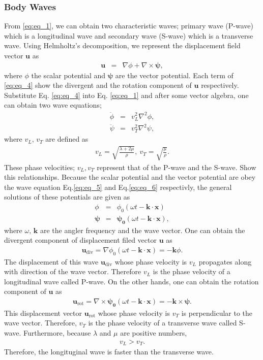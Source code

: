 \subsubsection{Body Waves}
From \ref{eq:eq_1}, we can obtain two characteristic waves; primary wave (P-wave) which is a longitudinal wave and secondary wave (S-wave) which is a transverse wave. Using Helmholtz's decomposition, we represent the displacement field vector $\bm{u}$ as
\begin{eqnarray} 
  \bm{u} &=& \nabla\phi + \nabla\times\bm{\psi}, \label{eq:eq_4}
\end{eqnarray}
where $\phi$ the scalar potential and $\bm{\psi}$ are the vector potential. Each term of \ref{eq:eq_4} show the divergent and the rotation component of $\bm{u}$ respectively. Substitute Eq. \ref{eq:eq_4} into Eq. \ref{eq:eq_1} and after some vector algebra, one can obtain two wave equations;
\begin{eqnarray}
  \ddot{\phi} &=& v_{L}^2\nabla^2\phi \label{eq:eq_5},\\
  \ddot{\psi} &=& v_{T}^2\nabla^2\psi \label{eq:eq_6}, 
\end{eqnarray}
where $v_{L},\,v_{T}$ are defined as 
\begin{eqnarray}
  v_{L} = \sqrt{\frac{\lambda+2\mu}{\rho}},\
  v_{T} = \sqrt{\frac{\mu}{\rho}}. \label{eq:eq_7}
\end{eqnarray} 
These phase velocities; $v_{L},v_{T}$ represent that of the P-wave and the S-wave. Show this relationships. Because the scalar potential and the vector potential are obey the wave equation Eq.\ref{eq:eq_5} and Eq.\ref{eq:eq_6} respectivly, the general solutions of these potentials are given as
\begin{eqnarray}
  \phi &=& \phi_{0}(\omega{t}-\bm{k}\cdot{\bm{x}}) \label{eq:eq_8}\\
  \bm{\psi} &=& \bm{\psi_{0}}(\omega{t}-\bm{k}\cdot{\bm{x}}) \label{eq:eq_9},
\end{eqnarray}
where $\omega,\,\bm{k}$ are the angler frequency and the wave vector. One can obtain the divergent component of displacement filed vector $\bm{u}$ as
\begin{eqnarray}
  \bm{u}_{\mathrm{div}} = \nabla{\phi_{0}(\omega{t}-\bm{k}\cdot{\bm{x}})} =-\bm{k}{\phi}.
\end{eqnarray}
The displacement of this wave $\bm{u}_{\mathrm{div}}$ whose phase velocity is $v_{L}$ propagates along with direction of the wave vector. Therefore $v_{L}$ is the phase velocity of a longitudinal wave called P-wave. On the other hands, one can obtain the rotation component of $\bm{u}$ as
\begin{eqnarray}
  \bm{u}_{\mathrm{rot}} = \nabla\times{\bm{\psi_{0}}(\omega{t}-\bm{k}\cdot{\bm{x}})} =-\bm{k}\times{\bm{\psi}}.
\end{eqnarray}
This displacement vector $\bm{u}_{\mathrm{rot}}$ whose phase velocity is $v_{T}$ is perpendicular to the wave vector. Therefore, $v_{T}$ is the phase velocity of a transverse wave called S-wave. Furthermore, because  $\lambda$ and $\mu$ are positive numbers, 
\begin{eqnarray}
  v_{L} > v_{T}.\label{eq:eq_10}
\end{eqnarray}
Therefore, the longituginal wave is faster than the transverse wave.

